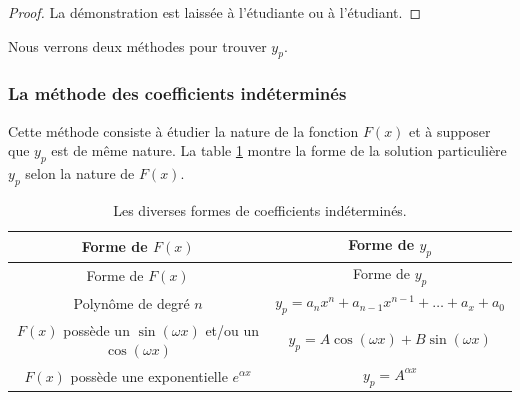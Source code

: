 \documentclass[]{book}
\theoremstyle{definition}
\theoremstyle{definition}
\theoremstyle{definition}
\theoremstyle{remark}
\let\BeginKnitrBlock\begin \let\EndKnitrBlock\end
\begin{document}
\BeginKnitrBlock{proof}
{}La démonstration est laissée à l'étudiante ou
à l'étudiant.
\EndKnitrBlock{proof}

Nous verrons deux méthodes pour trouver \(y_p\).

\hypertarget{la-methode-des-coefficients-indetermines}{%
\subsubsection{La méthode des coefficients
indéterminés}\label{la-methode-des-coefficients-indetermines}}

Cette méthode consiste à étudier la nature de la fonction \(F(x)\) et à
supposer que \(y_p\) est de même nature. La table
\ref{tab:coeff-indetermines} montre la forme de la solution particulière
\(y_p\) selon la nature de \(F(x)\).

\begin{longtable}[]{@{}cc@{}}
\caption{\label{tab:coeff-indetermines} Les diverses formes de coefficients
indéterminés.}\tabularnewline
\toprule
\begin{minipage}[b]{0.55\columnwidth}\centering
Forme de \(F(x)\)\strut
\end{minipage} & \begin{minipage}[b]{0.39\columnwidth}\centering
Forme de \(y_p\)\strut
\end{minipage}\tabularnewline
\midrule
\endfirsthead
\toprule
\begin{minipage}[b]{0.55\columnwidth}\centering
Forme de \(F(x)\)\strut
\end{minipage} & \begin{minipage}[b]{0.39\columnwidth}\centering
Forme de \(y_p\)\strut
\end{minipage}\tabularnewline
\midrule
\endhead
\begin{minipage}[t]{0.55\columnwidth}\centering
Polynôme de degré \(n\)\strut
\end{minipage} & \begin{minipage}[t]{0.39\columnwidth}\centering
\(y_p=a_nx^n+a_{n-1}x^{n-1}+\ldots+a_x+a_0\)\strut
\end{minipage}\tabularnewline
\begin{minipage}[t]{0.55\columnwidth}\centering
\(F(x)\) possède un \(\sin(\omega x)\) et/ou un \(\cos(\omega x)\)\strut
\end{minipage} & \begin{minipage}[t]{0.39\columnwidth}\centering
\(y_p=A\cos(\omega x)+B\sin(\omega x)\)\strut
\end{minipage}\tabularnewline
\begin{minipage}[t]{0.55\columnwidth}\centering
\(F(x)\) possède une exponentielle \(e^{\alpha x}\)\strut
\end{minipage} & \begin{minipage}[t]{0.39\columnwidth}\centering
\(y_p=A^{\alpha x}\)\strut
\end{minipage}\tabularnewline
\bottomrule
\end{longtable}
\end{document}

